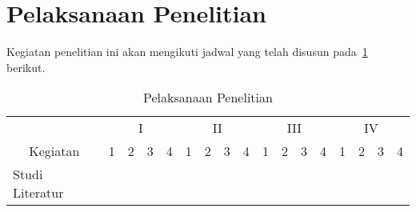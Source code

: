 \section{Pelaksanaan Penelitian}
Kegiatan penelitian ini akan mengikuti jadwal yang telah disusun pada~\ref{tab:kegiatan} berikut.

\begin{table}[h!]
	\centering
	\caption{Pelaksanaan Penelitian}
	\label{tab:kegiatan}
	\begin{tabular}{|l|llll|llll|llll|llll|}
		\hline
		\multicolumn{1}{|c|}{}                           & \multicolumn{4}{c|}{I}                                                                                                                                                                        & \multicolumn{4}{c|}{II}                                                                                                                                                  & \multicolumn{4}{c|}{III}                                                                                                                                                 & \multicolumn{4}{c|}{IV}                                                                                                                                                  \\ \cline{2-17} 
		\multicolumn{1}{|c|}{\multirow{-2}{*}{Kegiatan}} & \multicolumn{1}{c|}{1}                        & \multicolumn{1}{c|}{2}                        & \multicolumn{1}{c|}{3}                        & \multicolumn{1}{c|}{4}                        & \multicolumn{1}{c|}{1}                        & \multicolumn{1}{c|}{2}                        & \multicolumn{1}{c|}{3}                        & \multicolumn{1}{c|}{4}   & \multicolumn{1}{c|}{1}                        & \multicolumn{1}{c|}{2}                        & \multicolumn{1}{c|}{3}                        & \multicolumn{1}{c|}{4}   & \multicolumn{1}{c|}{1}                        & \multicolumn{1}{c|}{2}                        & \multicolumn{1}{c|}{3}                        & \multicolumn{1}{c|}{4}   \\ \hline
		Studi Literatur                                  & \multicolumn{1}{c|}{\cellcolor[HTML]{9B9B9B}} & \multicolumn{1}{c|}{\cellcolor[HTML]{9B9B9B}} & \multicolumn{1}{c|}{}                         & \multicolumn{1}{c|}{}                         & \multicolumn{1}{c|}{}                         & \multicolumn{1}{c|}{}                         & \multicolumn{1}{c|}{}                         & \multicolumn{1}{c|}{}    & \multicolumn{1}{c|}{}                         & \multicolumn{1}{c|}{}                         & \multicolumn{1}{c|}{}                         & \multicolumn{1}{c|}{}    & \multicolumn{1}{c|}{}                         & \multicolumn{1}{c|}{}                         & \multicolumn{1}{c|}{}                         & \multicolumn{1}{c|}{}    \\ \hline

\end{tabular}
\end{table}
